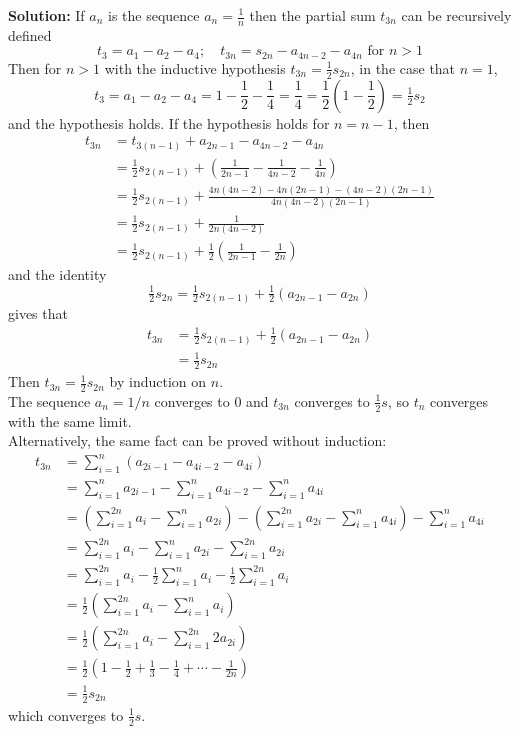 \documentclass{article}
\newcommand{\solution}[1]{\setlength{\hangindent}{\parindent} \indent\indent \textbf{Solution: }#1\hfill\break}
\begin{document}
\solution{If $a_n$ is the sequence $a_n = \tfrac{1}{n}$ then the partial sum $t_{3n}$ can be recursively defined 
$$t_{3} = a_1 - a_2 - a_4; \quad t_{3n} = s_{2n} - a_{4n-2} - a_{4n}\text { for } n>1$$
Then for $n>1$ with the inductive hypothesis $t_{3n} = \tfrac{1}{2} s_{2n}$, in the case that $n=1$, 
$$t_3 = a_1 -a_2-a_4 = 1 - \frac{1}{2} -\frac{1}{4} = \frac{1}{4} = \frac{1}{2}\left(1-\frac{1}{2}\right) = \tfrac{1}{2}s_2$$
and the hypothesis holds. If the hypothesis holds for $n=n-1$, then
\begin{align*}
t_{3n} &= t_{3(n-1)} + a_{2n-1} - a_{4n-2} - a_{4n} \\
&= \tfrac{1}{2}s_{2(n-1)} + \left(\frac{1}{2n-1} - \frac{1}{4n-2} - \frac{1}{4n}\right) \\
&= \tfrac{1}{2}s_{2(n-1)} + \frac{4n(4n-2) -4n(2n-1)-(4n-2)(2n-1)}{4n(4n-2)(2n-1)} \\
&= \tfrac{1}{2}s_{2(n-1)} +\frac{1}{2n(4n-2)} \\
&= \tfrac{1}{2} s_{2(n-1)} + \frac{1}{2}\left(\frac{1}{2n-1} - \frac{1}{2n}\right)
\end{align*}
and the identity 
$$\tfrac{1}{2}s_{2n} = \tfrac{1}{2}s_{2(n-1)} + \tfrac{1}{2}(a_{2n-1} - a_{2n})$$
gives that 
\begin{align*}
t_{3n} &= \tfrac{1}{2}s_{2(n-1)} + \tfrac{1}{2}(a_{2n-1} - a_{2n})\\
&= \tfrac{1}{2}s_{2n}
\end{align*}
Then $t_{3n} = \frac{1}{2}s_{2n}$ by induction on $n$. \\
\indent The sequence $a_n = 1/n$ converges to 0 and $t_{3n}$ converges to $\frac{1}{2}s$, so $t_n$ converges with the same limit. \\
\indent Alternatively, the same fact can be proved without induction:
\begin{align*}
t_{3n} &= \sum_{i=1}^n (a_{2i-1} - a_{4i-2} - a_{4i}) \\
&= \sum_{i=1}^n a_{2i-1} -\sum_{i=1}^n a_{4i-2} - \sum_{i=1}^na_{4i}\\
&= \left(\sum_{i=1}^{2n} a_{i}-\sum_{i=1}^na_{2i}\right) -\left(\sum_{i=1}^{2n} a_{2i} - \sum_{i=1}^n a_{4i} \right) - \sum_{i=1}^na_{4i}\\
&= \sum_{i=1}^{2n} a_{i}-\sum_{i=1}^na_{2i} -\sum_{i=1}^{2n} a_{2i} \\
&= \sum_{i=1}^{2n} a_{i}-\frac{1}{2}\sum_{i=1}^na_{i} -\frac{1}{2}\sum_{i=1}^{2n} a_{i} \\
&= \frac{1}{2}\left(\sum_{i=1}^{2n} a_{i}-\sum_{i=1}^na_{i}\right) \\
&= \frac{1}{2}\left(\sum_{i=1}^{2n} a_{i}-\sum_{i=1}^{2n}2a_{2i}\right) \\
&= \tfrac{1}{2} \left(1-\tfrac{1}{2}+\tfrac{1}{3}-\tfrac{1}{4}+\dotsb-\frac{1}{2n}\right)\\
&= \tfrac{1}{2} s_{2n}
\end{align*}
which converges to $\tfrac{1}{2}s$. } %
\end{document}
